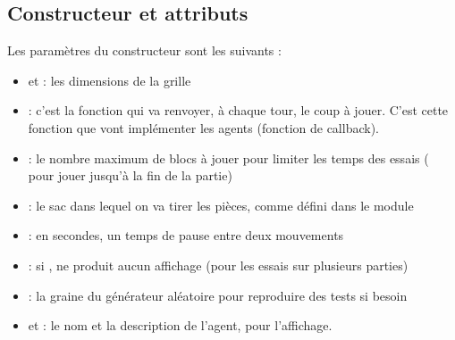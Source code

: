\subsection{Constructeur et attributs}
Les paramètres du constructeur sont les suivants :
\begin{itemize}
	\item {} et  : les dimensions de la grille
	\item {} : c'est la fonction qui va renvoyer, à chaque tour, le coup à jouer. C'est cette fonction que vont implémenter les agents (fonction de callback).
	\item {} : le nombre maximum de blocs à jouer pour limiter les temps des essais ( pour jouer jusqu'à la fin de la partie)
	\item {} : le sac dans lequel on va tirer les pièces, comme défini dans le module 
	\item {} : en secondes, un temps de pause entre deux mouvements
	\item {} : si , ne produit aucun affichage (pour les essais sur plusieurs parties)
	\item {} : la graine du générateur aléatoire pour reproduire des tests si besoin
	\item {} et  : le nom et la description de l'agent, pour l'affichage.
\end{itemize}

